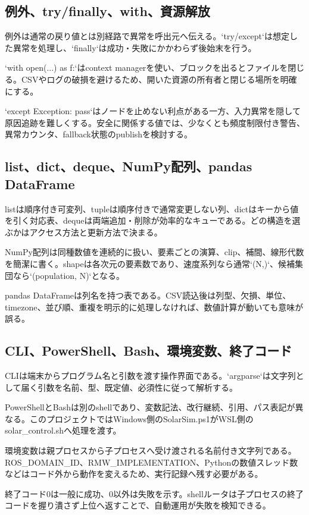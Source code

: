 \documentclass[a4paper,11pt]{article}
\begin{document}
\subsection{例外、try/finally、with、資源解放}
例外は通常の戻り値とは別経路で異常を呼出元へ伝える。`try/except`は想定した異常を処理し、`finally`は成功・失敗にかかわらず後始末を行う。


`with open(...) as f:`はcontext managerを使い、ブロックを出るとファイルを閉じる。CSVやログの破損を避けるため、開いた資源の所有者と閉じる場所を明確にする。


`except Exception: pass`はノードを止めない利点がある一方、入力異常を隠して原因追跡を難しくする。安全に関係する値では、少なくとも頻度制限付き警告、異常カウンタ、fallback状態のpublishを検討する。



\subsection{list、dict、deque、NumPy配列、pandas DataFrame}
listは順序付き可変列、tupleは順序付きで通常変更しない列、dictはキーから値を引く対応表、dequeは両端追加・削除が効率的なキューである。どの構造を選ぶかはアクセス方法と更新方法で決まる。


NumPy配列は同種数値を連続的に扱い、要素ごとの演算、clip、補間、線形代数を簡潔に書く。shapeは各次元の要素数であり、速度系列なら通常`(N,)`、候補集団なら`(population, N)`となる。


pandas DataFrameは列名を持つ表である。CSV読込後は列型、欠損、単位、timezone、並び順、重複を明示的に処理しなければ、数値計算が動いても意味が誤る。



\subsection{CLI、PowerShell、Bash、環境変数、終了コード}
CLIは端末からプログラム名と引数を渡す操作界面である。`argparse`は文字列として届く引数を名前、型、既定値、必須性に従って解析する。


PowerShellとBashは別のshellであり、変数記法、改行継続、引用、パス表記が異なる。このプロジェクトではWindows側のSolarSim.ps1がWSL側のsolar\_control.shへ処理を渡す。


環境変数は親プロセスから子プロセスへ受け渡される名前付き文字列である。ROS\_DOMAIN\_ID、RMW\_IMPLEMENTATION、Pythonの数値スレッド数などはコード外から動作を変えるため、実行記録へ残す必要がある。


終了コード0は一般に成功、0以外は失敗を示す。shellルータは子プロセスの終了コードを握り潰さず上位へ返すことで、自動運用が失敗を検知できる。
\end{document}
